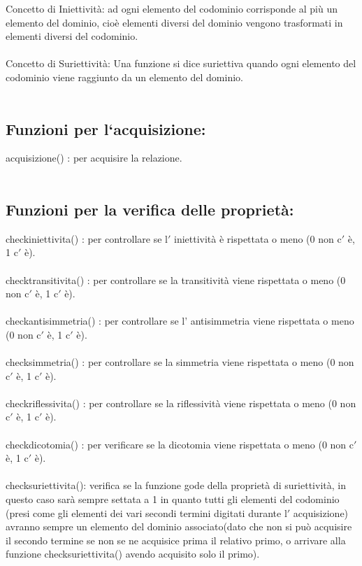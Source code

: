\documentclass[11pt, a4paper, titlepage, block]{article}
\begin{document}
Concetto di Iniettivit\`a: ad ogni elemento del codominio corrisponde al pi\`u
un elemento del dominio, cio\`e elementi diversi del dominio
vengono trasformati in elementi diversi del codominio.\\
\\
Concetto di Suriettivit\`a: Una funzione si dice suriettiva quando ogni elemento del codominio viene raggiunto da un elemento del dominio.\\
\\
\newpage
	\subsection{Funzioni per l`acquisizione:}
	
	acquisizione() : per acquisire la relazione.\\
	\\
	
	\subsection{Funzioni per la verifica delle propriet\`a:}

	check\textunderscore iniettivita() : per controllare se l$'$ iniettivit\`a \`e rispettata o meno (0 non c$'$ \`e, 1 c$'$ \`e).\\
	\\
	check\textunderscore transitivita() : per controllare se la transitivit\`a 
	viene rispettata o meno (0 non c$'$ \`e, 1 c$'$ \`e).\\
	\\
	check\textunderscore antisimmetria() : per controllare se l' antisimmetria viene rispettata o meno (0 non c$'$ \`e, 1 c$'$ \`e).\\
	\\
	check\textunderscore simmetria() : per controllare se la simmetria viene rispettata o meno (0 non c$'$ \`e, 1 c$'$ \`e).\\
	\\
	check\textunderscore riflessivita() : per controllare se la riflessivit\`a viene rispettata o meno (0 non c$'$ \`e, 1 c$'$ \`e).\\
	\\
	check\textunderscore dicotomia() : per verificare se la dicotomia viene rispettata o meno (0 non c$'$ \`e, 1 c$'$ \`e).\\
	\\
	check\textunderscore suriettivita(): verifica se la funzione gode della propriet\`a di suriettivit\`a, in questo caso sar\`a sempre settata a 1 in quanto tutti gli elementi del codominio (presi come gli elementi dei vari secondi termini digitati durante l$'$ acquisizione) avranno sempre un elemento del dominio associato(dato che non si pu\`o acquisire il secondo termine se non se ne acquisice prima il relativo primo, o arrivare alla funzione check\textunderscore suriettivita() avendo acquisito solo il primo).\\
	\\
	\newpage
\end{document}
